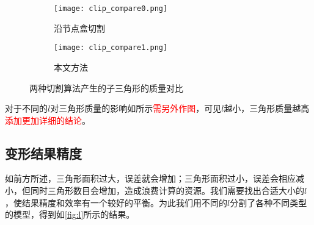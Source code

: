 \begin{figure}[htbp]
	\centering
	\begin{subfigure}[b]{.4\textwidth}
		\centering
		\texttt{[image: clip\_compare0.png]}
		\caption{沿节点盒切割}\label{subfig:clip_compare0}
	\end{subfigure}%
	\begin{subfigure}[b]{.4\textwidth}
		\centering
		\texttt{[image: clip\_compare1.png]}
		\caption{本文方法}\label{subfig:clip_compare1}
	\end{subfigure}
	\caption{两种切割算法产生的子三角形的质量对比}\label{fig:triangle_quality_compare}
\end{figure}

对于不同的$l$对三角形质量的影响如所示\textcolor{red}{需另外作图}，可见$l$越小，三角形质量越高\textcolor{red}{添加更加详细的结论}。

\subsection{变形结果精度}
如前方所述，三角形面积过大，误差就会增加；三角形面积过小，误差会相应减小，但同时三角形数目会增加，造成浪费计算的资源。我们需要找出合适大小的$l$，使结果精度和效率有一个较好的平衡。为此我们用不同的$l$分割了各种不同类型的模型，得到如\autoref{fig:l}所示的结果。

